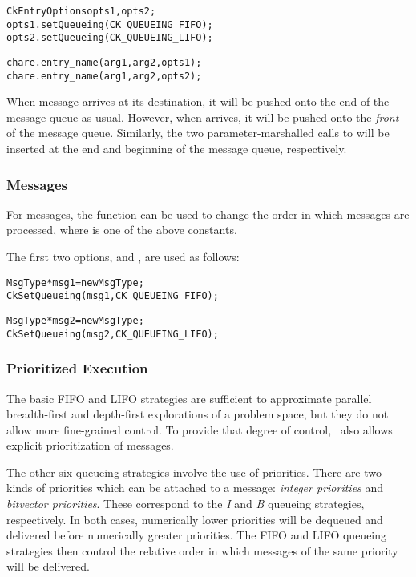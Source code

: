 \begin{alltt}
  CkEntryOptions opts1, opts2;
  opts1.setQueueing(CK_QUEUEING_FIFO);
  opts2.setQueueing(CK_QUEUEING_LIFO);

  chare.entry_name(arg1, arg2, opts1);
  chare.entry_name(arg1, arg2, opts2);
\end{alltt}

When message  arrives at its destination, it will be pushed onto the
end of the message queue as usual.  However, when  arrives, it will be
pushed onto the \emph{front} of the message queue. Similarly, the two
parameter-marshalled calls to  will be inserted at the end and
beginning of the message queue, respectively.

\subsubsection{Messages}

For messages, the  function can be used to change the order
in which messages are processed, where  is one of the above
constants.\\


\noindent The first two options,   and
, are used as follows:
%
\begin{alltt}
  MsgType *msg1 = new MsgType ;
  CkSetQueueing(msg1, CK_QUEUEING_FIFO);

  MsgType *msg2 = new MsgType ;
  CkSetQueueing(msg2, CK_QUEUEING_LIFO);
\end{alltt}

\subsubsection{Prioritized Execution}
\label{prioritized message passing}

The basic FIFO and LIFO strategies are sufficient to approximate parallel
breadth-first and depth-first explorations of a problem space, but they do not
allow more fine-grained control. To provide that degree of control, \charmpp\
also allows explicit prioritization of messages.

The other six queueing strategies involve the use of
priorities.  There are two kinds of priorities which can be
attached to a message: \emph{integer priorities}\index{integer priorities} and
\emph{bitvector priorities}\index{bitvector priorities}. These correspond to
the \emph{I} and \emph{B} queueing strategies, respectively. In both cases,
numerically lower priorities will be dequeued and delivered before numerically
greater priorities. The FIFO and LIFO queueing strategies then control the
relative order in which messages of the same priority will be delivered.

